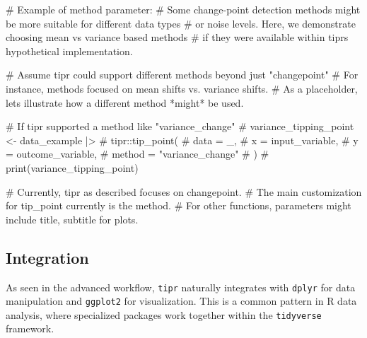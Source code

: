\documentclass[
  10pt,
  letterpaper,
  DIV=11,
  numbers=noendperiod]{scrartcl}
\newenvironment{Shaded}{\begin{snugshade}}{\end{snugshade}}
\newcommand{\CommentTok}[1]{\textcolor[rgb]{0.37,0.37,0.37}{#1}}
\begin{document}
\begin{Shaded}
\begin{Highlighting}[]
\CommentTok{\# Example of method parameter:}
\CommentTok{\# Some change{-}point detection methods might be more suitable for different data types}
\CommentTok{\# or noise levels. Here, we demonstrate choosing \textquotesingle{}mean\textquotesingle{} vs \textquotesingle{}variance\textquotesingle{} based methods}
\CommentTok{\# if they were available within tipr\textquotesingle{}s hypothetical implementation.}

\CommentTok{\# Assume \textquotesingle{}tipr\textquotesingle{} could support different methods beyond just "changepoint"}
\CommentTok{\# For instance, methods focused on mean shifts vs. variance shifts.}
\CommentTok{\# As a placeholder, let\textquotesingle{}s illustrate how a different method *might* be used.}

\CommentTok{\# If tipr supported a method like "variance\_change"}
\CommentTok{\# variance\_tipping\_point \textless{}{-} data\_example |\textgreater{}}
\CommentTok{\#   tipr::tip\_point(}
\CommentTok{\#     data = \_,}
\CommentTok{\#     x = input\_variable,}
\CommentTok{\#     y = outcome\_variable,}
\CommentTok{\#     method = "variance\_change"}
\CommentTok{\#   )}
\CommentTok{\# print(variance\_tipping\_point)}

\CommentTok{\# Currently, \textquotesingle{}tipr\textquotesingle{} as described focuses on \textquotesingle{}changepoint\textquotesingle{}.}
\CommentTok{\# The main customization for \textasciigrave{}tip\_point\textasciigrave{} currently is the method.}
\CommentTok{\# For other functions, parameters might include \textasciigrave{}title\textasciigrave{}, \textasciigrave{}subtitle\textasciigrave{} for plots.}
\end{Highlighting}
\end{Shaded}

\subsection{Integration}\label{integration}

As seen in the advanced workflow, \texttt{tipr} naturally integrates
with \texttt{dplyr} for data manipulation and \texttt{ggplot2} for
visualization. This is a common pattern in R data analysis, where
specialized packages work together within the \texttt{tidyverse}
framework.
\end{document}
